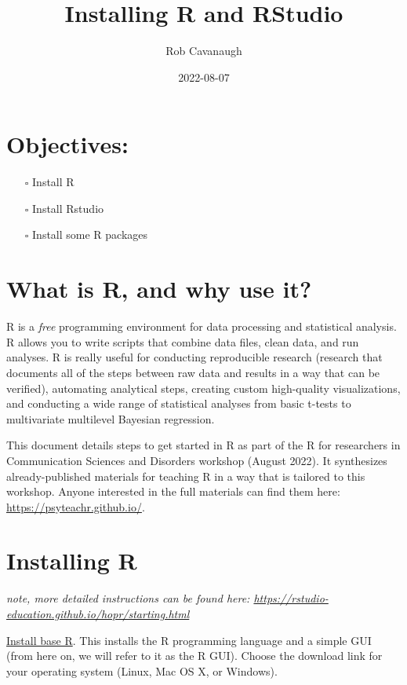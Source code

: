 \documentclass[
]{article}
\title{Installing R and RStudio}
\author{Rob Cavanaugh}
\date{2022-08-07}
\providecommand{\tightlist}{%
  \setlength{\itemsep}{0pt}\setlength{\parskip}{0pt}}
\begin{document}
\maketitle

\hypertarget{objectives}{%
\section{Objectives:}\label{objectives}}

\begin{itemize}
\tightlist
\item[$\square$]
  Install R
\item[$\square$]
  Install Rstudio
\item[$\square$]
  Install some R packages
\end{itemize}

\hypertarget{what-is-r-and-why-use-it}{%
\section{What is R, and why use it?}\label{what-is-r-and-why-use-it}}

R is a \emph{free} programming environment for data processing and
statistical analysis. R allows you to write scripts that combine data
files, clean data, and run analyses. R is really useful for conducting
reproducible research (research that documents all of the steps between
raw data and results in a way that can be verified), automating
analytical steps, creating custom high-quality visualizations, and
conducting a wide range of statistical analyses from basic t-tests to
multivariate multilevel Bayesian regression.

This document details steps to get started in R as part of the R for
researchers in Communication Sciences and Disorders workshop (August
2022). It synthesizes already-published materials for teaching R in a
way that is tailored to this workshop. Anyone interested in the full
materials can find them here: \url{https://psyteachr.github.io/}.

\hypertarget{installing-r}{%
\section{Installing R}\label{installing-r}}

\emph{note, more detailed instructions can be found here:
\url{https://rstudio-education.github.io/hopr/starting.html}}

\href{https://cran.rstudio.com/}{Install base R}. This installs the R
programming language and a simple GUI (from here on, we will refer to it
as the R GUI). Choose the download link for your operating system
(Linux, Mac OS X, or Windows).
\end{document}
